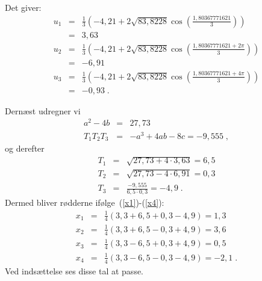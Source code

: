 \documentclass[12pt,oneside,a4paper]{article}
\newcommand{\bas}{\begin{eqnarray*}}
\newcommand{\eas}{\end{eqnarray*}}
\newcommand{\bea}{\begin{eqnarray}}
\newcommand{\eea}{\end{eqnarray}}
\begin{document}
Det giver:
\bas
u_1 &=& \frac13 \left(-4,21 + 2\sqrt{83,8228} \cos\left(\frac{1,80367771621}{3}\right)\right) \\
 &=& 3,63 \\
u_2 &=& \frac13 \left(-4,21 + 2\sqrt{83,8228} \cos\left(\frac{1,80367771621+2\pi}{3}\right)\right) \\
 &=& -6,91 \\
u_3 &=& \frac13 \left(-4,21 + 2\sqrt{83,8228} \cos\left(\frac{1,80367771621+4\pi}{3}\right)\right) \\
 &=& -0,93 \;.
\eas

Dernæst udregner vi
\bas
    a^2-4b &=& 27,73 \\
    T_1T_2T_3 &=& -a^3 + 4ab - 8c = -9,555 \;,
\eas
og derefter
\bas
T_1 &=& \sqrt{27,73 + 4\cdot 3,63} = 6,5 \\
T_2 &=& \sqrt{27,73 - 4\cdot 6,91} = 0,3 \\
T_3 &=& \frac{-9,555}{6,5\cdot 0,3} = -4,9 \;.
\eas
Dermed bliver rødderne ifølge~(\ref{x1})-(\ref{x4}):
\bea
x_1 &=& \frac14(3,3+6,5+0,3-4,9) = 1,3 \\
x_2 &=& \frac14(3,3+6,5-0,3+4,9) = 3,6 \\
x_3 &=& \frac14(3,3-6,5+0,3+4,9) = 0,5 \\
x_4 &=& \frac14(3,3-6,5-0,3-4,9) = -2,1 \;.
\eea
Ved indsættelse ses disse tal at passe.
\end{document}
